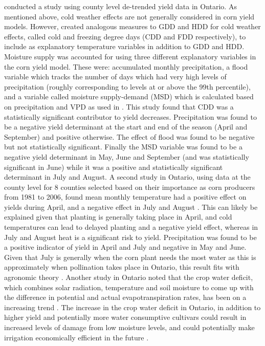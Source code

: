 \cite{tolhurst2015cold} conducted a study using county level de-trended yield data in Ontario. As mentioned above, cold weather effects are not generally considered in corn yield models. However, \cite{tolhurst2015cold} created analogous measures to GDD and HDD for cold weather effects, called cold and freezing degree days (CDD and FDD respectively), to include as explanatory temperature variables in addition to GDD and HDD. Moisture supply was accounted for using three different explanatory variables in the corn yield model. These were: accumulated monthly precipitation, a flood variable which tracks the number of days which had very high levels of precipitation (roughly corresponding to levels at or above the 99th percentile), and a variable called moisture supply-demand (MSD) which is calculated based on precipitation and VPD as used in \cite{urban2015impacts}. This study found that CDD was a statistically significant contributor to yield decreases. Precipitation was found to be a negative yield determinant at the start and end of the season (April and September) and positive otherwise. The effect of flood was found to be negative but not statistically significant.  Finally the MSD variable was found to be a negative yield determinant in May, June and September (and was statistically significant in June) while it was a positive and statistically significant determinant in July and August. A second study in Ontario, using data at the county level for 8 counties selected based on their importance as corn producers from 1981 to 2006, found mean monthly temperature had a positive effect on yields during April, and a negative effect in July and August \cite{cabas2010crop}. This can likely be explained given that planting is generally taking place in April, and cold temperatures can lead to delayed planting and a negative yield effect, whereas in July and August heat is a significant risk to yield. Precipitation was found to be a positive indicator of yield in April and July and negative in May and June. Given that July is generally when the corn plant needs the most water as this is approximately when pollination takes place in Ontario, this result fits with agronomic theory \citep{OMAFRA}. Another study in Ontario noted that the crop water deficit, which combines solar radiation, temperature and soil moisture to come up with the difference in potential and actual evapotranspiration rates, has been on a increasing trend \citep{tan2003impacts}. The increase in the crop water deficit in Ontario, in addition to higher yield and potentially more water consumptive cultivars could result in increased levels of damage from low moisture levels, and could potentially make irrigation economically efficient in the future \citep{tan2003impacts}. 


